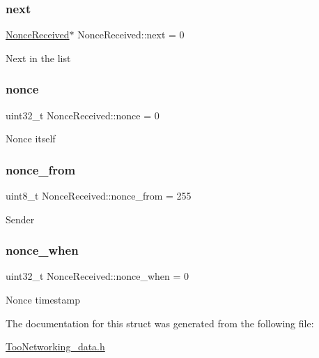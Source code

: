 \subsubsection{\texorpdfstring{next}{next}}
{\footnotesize\ttfamily \hyperlink{structNonceReceived}{Nonce\+Received}$\ast$ Nonce\+Received\+::next = 0}

Next in the list \mbox{\label{structNonceReceived_a8da2f90de05746f252706f24ec5bc539}} 
\subsubsection{\texorpdfstring{nonce}{nonce}}
{\footnotesize\ttfamily uint32\+\_\+t Nonce\+Received\+::nonce = 0}

Nonce itself \mbox{\label{structNonceReceived_aa6f2777bb591400ce057bd1fa9b23fca}} 
\subsubsection{\texorpdfstring{nonce\+\_\+from}{nonce\_from}}
{\footnotesize\ttfamily uint8\+\_\+t Nonce\+Received\+::nonce\+\_\+from = 255}

Sender \mbox{\label{structNonceReceived_a70f93629f2db41ac9f7850c83df5debd}} 
\subsubsection{\texorpdfstring{nonce\+\_\+when}{nonce\_when}}
{\footnotesize\ttfamily uint32\+\_\+t Nonce\+Received\+::nonce\+\_\+when = 0}

Nonce timestamp 

The documentation for this struct was generated from the following file\+:\begin{DoxyCompactItemize}
\item 
\hyperlink{TooNetworking__data_8h}{Too\+Networking\+\_\+data.\+h}\end{DoxyCompactItemize}

